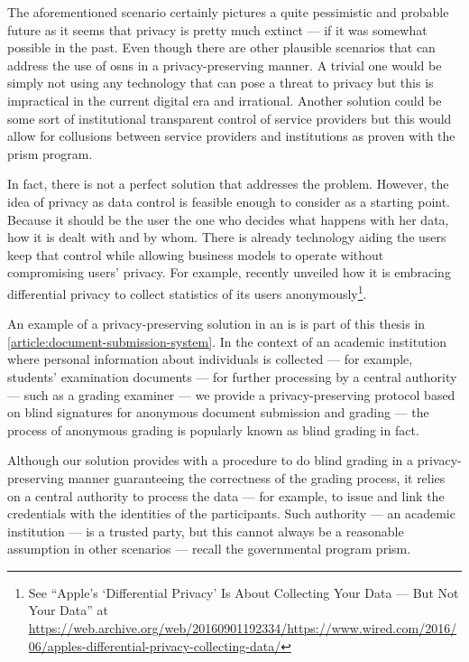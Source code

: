 \documentclass[showtrims, oldfontcommands]{kthesis}
\begin{document}
The aforementioned scenario certainly pictures a quite pessimistic and probable 
future as it seems that privacy is pretty much extinct --- if it was somewhat possible 
in the past. Even though there are other plausible scenarios that can address the 
use of \acp{osn} in a privacy-preserving manner. A trivial one would be simply not 
using any technology that can pose a threat to privacy but this is impractical in 
the current digital era and irrational. Another solution could be some sort of institutional 
transparent control of service providers but this would allow for collusions between 
service providers and institutions as proven with the \ac{prism} program.

In fact, there is not a perfect solution that addresses the problem. However, the 
idea of privacy as data control is feasible enough to consider as a starting point. 
Because it should be the user the one who decides what happens with her data, how 
it is dealt with and by whom. There is already technology aiding the users keep 
that control while allowing business models to operate without compromising users' 
privacy. For example, \Apple recently unveiled how it is embracing differential 
privacy to collect statistics of its users anonymously\footnote{See ``Apple's `Differential Privacy' Is About Collecting Your Data --- But Not Your Data'' at \url{https://web.archive.org/web/20160901192334/https://www.wired.com/2016/06/apples-differential-privacy-collecting-data/}}.

An example of a privacy-preserving solution in an \ac{is} is part of 
this thesis in \cref{article:document-submission-system}. In the context of an academic 
institution where personal information about individuals is collected --- for example, 
students' examination documents --- for further processing by a central authority 
--- such as a grading examiner --- we provide a privacy-preserving protocol based 
on blind signatures for anonymous document submission and grading --- the process 
of anonymous grading is popularly known as blind grading in fact. 

Although our solution provides with a procedure to do blind grading in a privacy-preserving 
manner guaranteeing the correctness of the grading process, it relies on a central 
authority to process the data --- for example, to issue and link the credentials with 
the identities of the participants. Such authority --- an academic institution --- 
is a trusted party, but this cannot always be a reasonable assumption in other scenarios 
--- recall the governmental program \ac{prism}.
\end{document}
